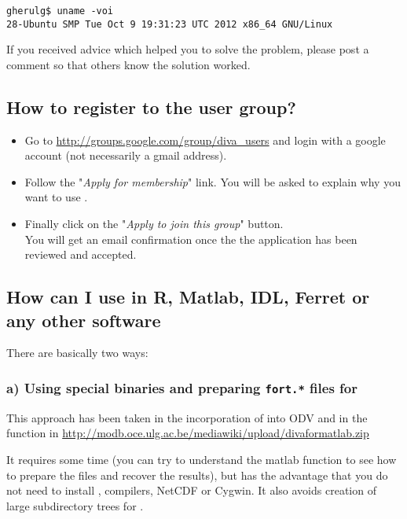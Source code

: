 \begin{lstlisting}[style=Bash]
gherulg$ uname -voi
28-Ubuntu SMP Tue Oct 9 19:31:23 UTC 2012 x86_64 GNU/Linux
\end{lstlisting}

If you received advice which helped you to solve the problem, please post a comment so that others know the solution worked. 


\subsection{How to register to the user group?}
\begin{itemize}
\item Go to \url{http://groups.google.com/group/diva_users} and login with a google account (not necessarily a gmail address). 
\item Follow the "\textit{Apply for membership}" link. You will be asked to explain why you want to use \diva.
\item Finally click on the "\textit{Apply to join this group}" button. \\
You will get an email confirmation once the the application has been reviewed and accepted.
\end{itemize}
 


\subsection{How can I use \diva in R, Matlab, IDL, Ferret or any other software}
There are basically two ways:

\subsubsection{a) Using special binaries and preparing {\tt fort.*} files for \diva}

This approach has been taken in the incorporation of \diva into ODV and in the \matlab{} function in \url{http://modb.oce.ulg.ac.be/mediawiki/upload/divaformatlab.zip}

It requires some time (you can try to understand the matlab function to see how to prepare the files and recover the results), but has the advantage that you do not need to install \diva, compilers, NetCDF or Cygwin. It also avoids creation of large subdirectory trees for \diva. 


